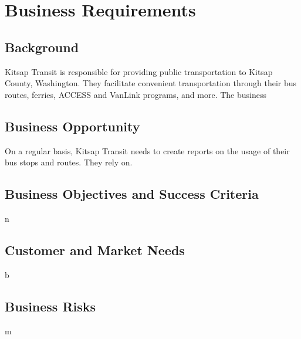 \section{Business Requirements}
\subsection{Background}
Kitsap Transit is responsible for providing public transportation to Kitsap County, Washington. They facilitate convenient transportation through their bus routes, ferries, ACCESS and VanLink programs, and more. The business
\raggedbottom
\subsection{Business Opportunity}
On a regular basis, Kitsap Transit needs to create reports on the usage of their bus stops and routes. They rely on.
\raggedbottom
\subsection{Business Objectives and Success Criteria}
n
\raggedbottom
\subsection{Customer and Market Needs}
b
\raggedbottom
\subsection{Business Risks}
m
\raggedbottom